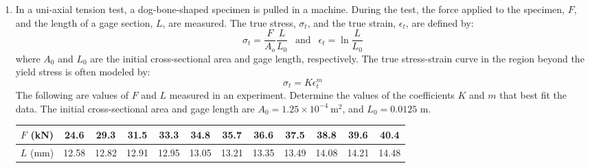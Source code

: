 \begin{fullwidth}
\begin{enumerate}
\vspace{3.0cm}

\item In a uni-axial tension test, a dog-bone-shaped specimen is pulled in a machine.  During the test, the force applied to the specimen, $F$, and the length of a gage section, $L$, are measured.  The true stress, $\sigma_t$, and the true strain, $\epsilon_t$, are defined by:
\begin{equation*}
\sigma_t = \frac{F}{A_o}\frac{L}{L_0} \ \ \text{ and } \ \ \epsilon_t = \ln{\frac{L}{L_0}}
\end{equation*}
where $A_0$ and $L_0$ are the initial cross-sectional area and gage length, respectively.  The true stress-strain curve in the region beyond the yield stress is often modeled by:
\begin{equation*}
\sigma_t = K\epsilon_t^m
\end{equation*}
The following are values of $F$ and $L$ measured in an experiment.  Determine the values of the coefficients $K$ and $m$ that best fit the data.  The initial cross-sectional area and gage length are $A_0 = 1.25 \times 10^{-4} \ \text{m}^2$, and $L_0 = 0.0125$ m.

\begin{table}[h!]
\begin{tabular}{|c|c|c|c|c|c|c|c|c|c|c|c|}
\hline
$F$ (kN) & 24.6 & 29.3 & 31.5 & 33.3 & 34.8 & 35.7 & 36.6 & 37.5 & 38.8 & 39.6 & 40.4 \\ \hline
$L$ (mm) & 12.58 & 12.82 & 12.91 & 12.95 & 13.05 & 13.21 & 13.35 & 13.49 & 14.08 & 14.21 & 14.48 \\ \hline
\end{tabular}
\end{table}


\end{enumerate}

\end{fullwidth}
